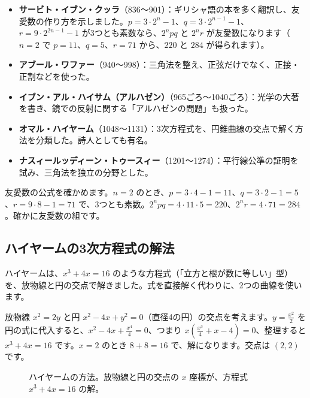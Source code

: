 \documentclass[a4paper,11pt,openany]{ltjsbook}
\begin{document}
\begin{itemize}[leftmargin=*]
\item \textbf{サービト・イブン・クッラ}（836〜901）：ギリシャ語の本を多く翻訳し、友愛数の作り方を示しました。$p=3\cdot2^{n}-1$、$q=3\cdot2^{n-1}-1$、$r=9\cdot2^{2n-1}-1$ が3つとも素数なら、$2^npq$ と $2^nr$ が友愛数になります（$n=2$ で $p=11$、$q=5$、$r=71$ から、$220$ と $284$ が得られます）。
\item \textbf{アブール・ワファー}（940〜998）：三角法を整え、正弦だけでなく、正接・正割などを使った。
\item \textbf{イブン・アル・ハイサム（アルハゼン）}（965ごろ〜1040ごろ）：光学の大著を書き、鏡での反射に関する「アルハゼンの問題」も扱った。
\item \textbf{オマル・ハイヤーム}（1048〜1131）：3次方程式を、円錐曲線の交点で解く方法を分類した。詩人としても有名。
\item \textbf{ナスィールッディーン・トゥースィー}（1201〜1274）：平行線公準の証明を試み、三角法を独立の分野とした。
\end{itemize}

友愛数の公式を確かめます。$n=2$ のとき、$p=3\cdot4-1=11$、$q=3\cdot2-1=5$、$r=9\cdot8-1=71$ で、3つとも素数。$2^npq=4\cdot11\cdot5=220$、$2^nr=4\cdot71=284$。確かに友愛数の組です。

\subsection{ハイヤームの3次方程式の解法}

ハイヤームは、$x^3+4x=16$ のような方程式（「立方と根が数に等しい」型）を、放物線と円の交点で解きました。式を直接解く代わりに、2つの曲線を使います。

放物線 $x^2=2y$ と円 $x^2-4x+y^2=0$（直径4の円）の交点を考えます。$y=\tfrac{x^2}{2}$ を円の式に代入すると、$x^2-4x+\tfrac{x^4}{4}=0$、つまり $x\left(\tfrac{x^3}{4}+x-4\right)=0$、整理すると $x^3+4x=16$ です。$x=2$ のとき $8+8=16$ で、解になります。交点は $(2,2)$ です。

\begin{figure}[htbp]
\centering
{}
\caption{ハイヤームの方法。放物線と円の交点の $x$ 座標が、方程式 $x^3+4x=16$ の解。}
\end{figure}
\end{document}
